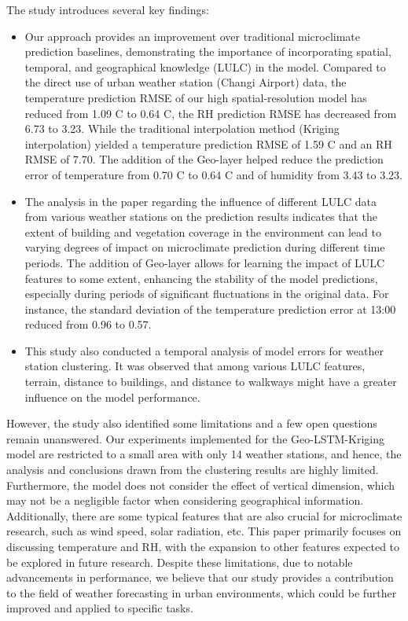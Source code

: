 \documentclass[a4paper,fleqn]{cas-sc}
\begin{document}
The study introduces several key findings:
\begin{itemize}
    \item Our approach provides an improvement over traditional microclimate prediction baselines, demonstrating the importance of incorporating spatial, temporal, and geographical knowledge (LULC) in the model. Compared to the direct use of urban weather station (Changi Airport) data, the temperature prediction RMSE of our high spatial-resolution model has reduced from 1.09 \textdegree C to 0.64 \textdegree C, the RH prediction RMSE has decreased from 6.73 to 3.23. While the traditional interpolation method (Kriging interpolation) yielded a temperature prediction RMSE of 1.59 \textdegree C and an RH RMSE of 7.70. The addition of the Geo-layer helped reduce the prediction error of temperature from 0.70 \textdegree C to 0.64 \textdegree C and of humidity from 3.43 to 3.23.

    \item The analysis in the paper regarding the influence of different LULC data from various weather stations on the prediction results indicates that the extent of building and vegetation coverage in the environment can lead to varying degrees of impact on microclimate prediction during different time periods. The addition of Geo-layer allows for learning the impact of LULC features to some extent, enhancing the stability of the model predictions, especially during periods of significant fluctuations in the original data. For instance, the standard deviation of the temperature prediction error at 13:00 reduced from 0.96 to 0.57.

    \item This study also conducted a temporal analysis of model errors for weather station clustering. It was observed that among various LULC features, terrain, distance to buildings, and distance to walkways might have a greater influence on the model performance.
    
\end{itemize} 

However, the study also identified some limitations and a few open questions remain unanswered. Our experiments implemented for the Geo-LSTM-Kriging model are restricted to a small area with only 14 weather stations, and hence, the analysis and conclusions drawn from the clustering results are highly limited. Furthermore, the model does not consider the effect of vertical dimension, which may not be a negligible factor when considering geographical information. Additionally, there are some typical features that are also crucial for microclimate research, such as wind speed, solar radiation, etc. This paper primarily focuses on discussing temperature and RH, with the expansion to other features expected to be explored in future research. Despite these limitations, due to notable advancements in performance, we believe that our study provides a contribution to the field of weather forecasting in urban environments, which could be further improved and applied to specific tasks.
\end{document}

